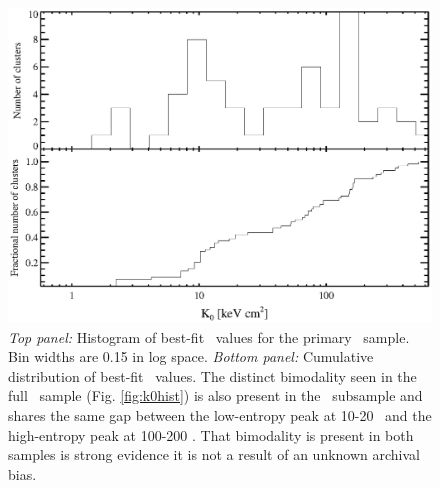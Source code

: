 \clearpage
\begin{figure}[htp]
  \begin{center}
    \begin{minipage}[htp]{0.9\linewidth}
      \includegraphics*[width=\textwidth, trim=20mm 10mm 10mm 10mm, clip]{hifl_k0hist.eps}
      \caption{{\it{Top panel:}} Histogram of best-fit \kna\ values
        for the primary \hifl\ sample. Bin widths are 0.15 in log
        space.  {\it{Bottom panel:}} Cumulative distribution of
        best-fit \kna\ values. The distinct bimodality seen in the
        full \accept\ sample (Fig. \ref{fig:k0hist}) is also present
        in the \hifl\ subsample and shares the same gap between the
        low-entropy peak at 10-20 \ent\ and the high-entropy peak at
        100-200 \ent. That bimodality is present in both samples is
        strong evidence it is not a result of an unknown archival
        bias.}
      \label{fig:hiflk0}
    \end{minipage}
  \end{center}
\end{figure}
\clearpage
